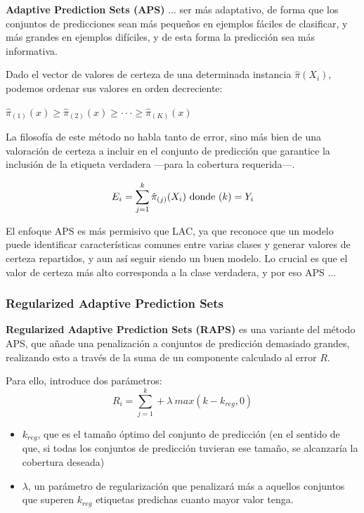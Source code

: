 \textbf{Adaptive Prediction Sets (APS)} \cite{romano2020} ... ser más adaptativo, de forma que los conjuntos 
de predicciones sean más pequeños en ejemplos fáciles de clasificar, y más grandes en ejemplos difíciles, 
y de esta forma la predicción sea más informativa.

Dado el vector de valores de certeza de una determinada instancia $\hat{\pi}(X_i)$, podemos ordenar sus 
valores en orden decreciente:

$\hat{\pi}_{(1)}(x) \ge \hat{\pi}_{(2)}(x) \ge \cdot\cdot\cdot \ge \hat{\pi}_{(K)}(x)$

La filosofía de este método no habla tanto de error, sino más bien de una valoración de certeza a incluir en 
el conjunto de predicción que garantice la inclusión de la etiqueta verdadera ---para la cobertura 
requerida---.

$$
E_i=\sum_{j=1}^{k} \hat{\pi}_{(j)}(X_i) \textnormal{ donde } (k)=Y_i
$$


El enfoque APS es más permisivo que LAC, ya que reconoce que un modelo puede identificar características 
comunes entre varias clases y generar valores de certeza repartidos, y aun así seguir siendo un buen modelo. 
Lo crucial es que el valor de certeza más alto corresponda a la clase verdadera, y por eso APS ...





\subsubsection{Regularized Adaptive Prediction Sets}

\textbf{Regularized Adaptive Prediction Sets (RAPS)} \cite{angelopoulos2020} es una variante del método APS,
que añade una penalización a conjuntos de predicción demasiado grandes, realizando esto a través de la suma 
de un componente calculado al error $R$.

Para ello, introduce dos parámetros:
$$
R_i = \sum_{j=1}^{k}{} + \lambda \ max(k-k_{reg},0)
$$

\begin{itemize}
    \item $k_{reg}$, que es el tamaño óptimo del conjunto de predicción (en el sentido de que, si todas los 
    conjuntos de predicción tuvieran ese tamaño, se alcanzaría la cobertura deseada)
    \item $\lambda$, un parámetro de regularización que penalizará más a aquellos conjuntos que superen 
    $k_{reg}$ etiquetas predichas cuanto mayor valor tenga.
\end{itemize}






